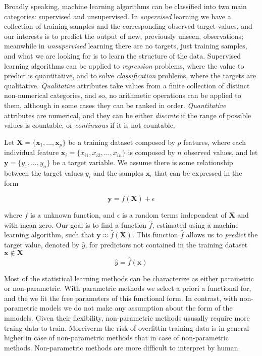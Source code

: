 Broadly speaking, machine learning algorithms can be classified into two main categories: supervised and unsupervised. In \emph{supervised} learning we have a collection of training samples and the corresponding observed target values, and our interests is to predict the output of new, previously unseen, observations; meanwhile in \emph{unsupervised} learning there are no targets, just training samples, and what we are looking for is to learn the structure of the data. Supervised learning algorithms can be applied to \emph{regression} problems, where the value to predict is quantitative, and to solve \emph{classification} problems, where the targets are qualitative. \emph{Qualitative} attributes take values from a finite collection of distinct non-numerical categories, and so, no arithmetic operations can be applied to them, although in some cases they can be ranked in order. \emph{Quantitative} attributes are numerical, and they can be either \emph{discrete} if the range of possible values is countable, or \emph{continuous} if it is not countable.

Let $\mathbf{X} = \{ \mathbf{x}_1, \ldots, \mathbf{x}_p \}$ be a training dataset composed by $p$ features, where each individual feature $\mathbf{x}_i = \{ x_{i1}, x_{i2}, \ldots, x_{in} \}$ is composed by $n$ observed values, and let $\mathbf{y} = \{ y_1, \ldots, y_n \}$ be a target variable. We assume there is some relationship between the target values $y_i$ and the samples $\mathbf{x}_i$ that can be expressed in the form

\begin{equation}
    \label{eq:machine_learning_model}
    \mathbf{y} = f\left( \mathbf{X} \right) + \epsilon
\end{equation}

where $f$ is a unknown function, and $\epsilon$ is a random terms independent of $\mathbf{X}$ and with mean zero. Our goal is to find a
function $\hat{f}$, estimated using a machine learning algorithm, such that $\mathbf{y} \approx \hat{f} \left( \mathbf{X} \right)$. This  function $\hat{f}$ allows us to \emph{predict} the target value, denoted by $\hat{y}$, for predictors not contained in the training dataset $\mathbf{x} \notin \mathbf{X}$
\[
    \hat{y} = \hat{f} \left( \mathbf{x} \right)
\]

Most of the statistical learning methods can be characterize as either parametric or non-parametric. With parametric methods we select a priori a functional for, and the we fit the free parameters of this functional form. In contrast, with non-parametric models we do not make any assumption about the form of the mmodels. Given their flexibility, non-parametric methods ususally require more traing data to train. Moreiverm the risk of overfittin training data is in general higher in case of non-parametric methods that in case of non-parametric methods. Non-parametric methods are more difficult to interpret by human.

